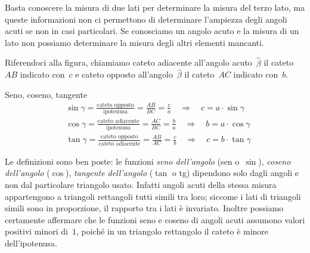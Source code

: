 \osservazione Basta conoscere la misura di due lati per determinare la misura 
del terzo lato, ma queste informazioni non ci permettono di determinare
l'ampiezza degli angoli acuti se non in casi particolari. Se conosciamo un 
angolo acuto e la misura di un lato non possiamo determinare la misura
degli altri elementi mancanti.

Riferendoci alla figura, chiamiamo cateto adiacente all'angolo 
acuto~\(\hat{\beta}\) il cateto~\({AB}\) indicato con~\(c\) e cateto opposto 
all'angolo~\(\hat{\beta}\) il
cateto~\({AC}\) indicato con~\(b\).

\begin{definizione}
Seno, coseno, tangente
\begin{align*}
&\sin \gamma=\frac{\text{cateto opposto}}{\text{ipotenusa}}=
\frac{AB}{BC}=\frac{c}{a} \quad \Rightarrow \quad c=a\cdot \sin \gamma\\
&\cos \gamma=\frac{\text{cateto adiacente}}{\text{ipotenusa}}=
\frac{AC}{BC}=\frac{b}{a} \quad \Rightarrow \quad b=a\cdot \cos \gamma\\
&\tan \gamma=\frac{\text{cateto opposto}}{\text{cateto adiacente}}=
\frac{AB}{AC}=\frac{c}{b} \quad \Rightarrow \quad c=b\cdot \tan \gamma
\end{align*}
\end{definizione}



Le definizioni sono ben poste: le funzioni \emph{seno dell'angolo} (sen 
o~\(\sin\)), \emph{coseno dell'angolo} (\(\cos\)), \emph{tangente dell'angolo}
(\(\tan\) o tg) dipendono solo dagli angoli e non dal particolare triangolo 
usato. 
Infatti angoli acuti della stessa misura appartengono a
triangoli rettangoli tutti simili tra loro; siccome i lati di triangoli 
simili 
sono in proporzione, il rapporto tra i lati è invariato.
Inoltre possiamo certamente affermare che le funzioni seno e coseno di angoli 
acuti assumono valori positivi minori di~\(1\),
poiché in un triangolo rettangolo il cateto è minore dell'ipotenusa.

